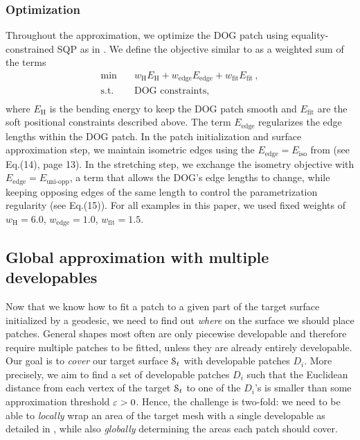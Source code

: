 \subsubsection{Optimization}

Throughout the approximation, we optimize the DOG patch using equality-constrained SQP as in \cite{Rabinovich:CurvedFolds:2019}. We define the objective similar to \cite{Rabinovich:DogShapeSpace:2018} as a weighted sum of the terms
%
\begin{align*}
	\min \quad & w_{\text{H}} E_{\text{H}} + w_{\text{edge}} E_{\text{edge}} + 
				  w_{\text{fit}} E_{\text{fit}} \,,\\
	\text{s.t.} \quad &\text{DOG constraints},\\
\end{align*}
%
where $ E_{\text{H}} $ is the bending energy to keep the DOG patch smooth and $E_{\text{fit}}$ are the soft positional constraints described above. The term $ E_{\text{edge}} $  regularizes the edge lengths within the DOG patch. 
In the patch initialization and surface approximation step, we maintain isometric edges using the $ E_\text{edge} = E_{\text{iso}} $ from \cite{Rabinovich:DogShapeSpace:2018} (see Eq.(14), page 13). 
In the stretching step, we exchange the isometry objective with $ E_\text{edge} = E_{\text{uni-opp}}$, a term that allows the DOG's edge lengths to change, while keeping opposing edges of the same length to control the parametrization regularity \cite{Rabinovich:DogShapeSpace:2018} (see Eq.(15)). 
For all examples in this paper, we used fixed weights of $w_{\text{H}}=6.0$, $w_{\text{edge}}=1.0$, $w_{\text{fit}}=1.5$.


\subsection{Global approximation with multiple developables} 
\label{sec:approximate_multiple_patches}

Now that we know how to fit a patch to a given part of the target surface initialized by a geodesic, we need to find out \emph{where} on the surface we should place patches. General shapes most often are only piecewise developable and therefore require multiple patches to be fitted, unless they are already entirely developable. 
Our goal is to \emph{cover} our target surface $\mathcal{S}_t$ with developable patches $D_i$. More precisely, we aim to find a set of developable patches $D_i$ such that the Euclidean distance from each vertex of the target $\mathcal{S}_t$ to one of the $D_i$'s is smaller than some approximation threshold $\varepsilon > 0$. 
Hence, the challenge is two-fold: we need to be able to \emph{locally} wrap an area of the target mesh with a single developable as detailed in  , while also \emph{globally} determining the areas each patch should cover.

